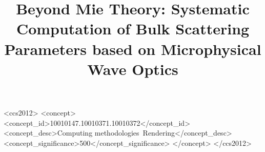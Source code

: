 \documentclass[acmtog,review,screen,anonymous,balance=false]{acmart}
\begin{document}
	\title{Beyond Mie Theory: Systematic Computation of Bulk Scattering Parameters based on Microphysical Wave Optics}
    
	\begin{CCSXML}
		<ccs2012>
		<concept>
		<concept_id>10010147.10010371.10010372</concept_id>
		<concept_desc>Computing methodologies~Rendering</concept_desc>
		<concept_significance>500</concept_significance>
		</concept>
		</ccs2012>
	\end{CCSXML}
    
    \maketitle
    
    
    
    
    
    
    
    
    
\end{document}
